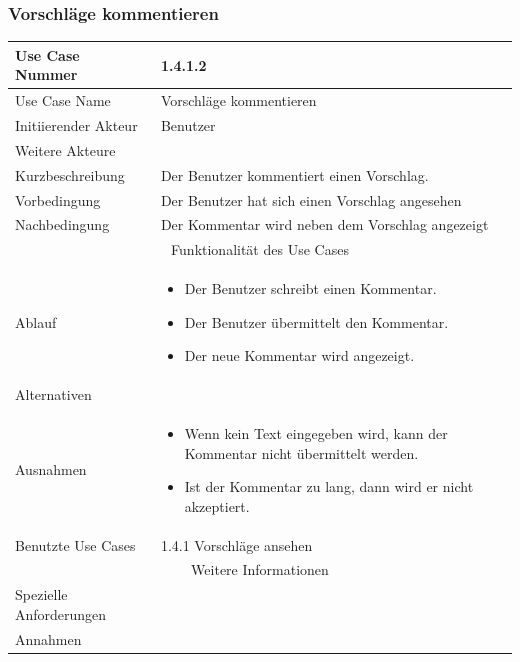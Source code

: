 \documentclass[10pt,a4paper]{article}
\begin{document}
	\subsubsection{Vorschl\"age kommentieren}
	\begin{tabularx}{\textwidth}{|l|X|}
		\hline Use Case Nummer & 1.4.1.2 \\ 
		\hline Use Case Name & Vorschl\"age kommentieren \\ 
		\hline Initiierender Akteur & Benutzer \\
		\hline Weitere Akteure & \\
		\hline Kurzbeschreibung & Der Benutzer kommentiert einen Vorschlag. \\
		\hline Vorbedingung & Der Benutzer hat sich einen Vorschlag angesehen \\
		\hline Nachbedingung & Der Kommentar wird neben dem Vorschlag angezeigt \\
		\hline \multicolumn{2}{|c|}{Funktionalität des Use Cases}\\
		\hline Ablauf & \begin{itemize}
			\item Der Benutzer schreibt einen Kommentar.
			\item Der Benutzer \"ubermittelt den Kommentar.
			\item Der neue Kommentar wird angezeigt.
		\end{itemize} \\ 
		\hline Alternativen &  \\
		\hline Ausnahmen & \begin{itemize}
			\item Wenn kein Text eingegeben wird, kann der Kommentar nicht \"ubermittelt werden.
			\item Ist der Kommentar zu lang, dann wird er nicht akzeptiert.
		\end{itemize} \\
		\hline Benutzte Use Cases & 1.4.1 Vorschl\"age ansehen\\
		\hline \multicolumn{2}{|c|}{Weitere Informationen} \\
		\hline Spezielle Anforderungen &  \\
		\hline Annahmen &  \\
		\hline
	\end{tabularx}
	
\end{document}
